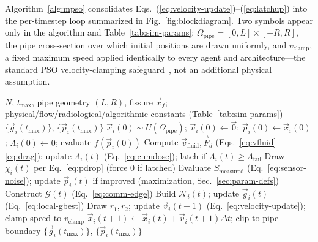 \documentclass[conference]{IEEEtran}
\begin{document}
Algorithm~\ref{alg:mpso} consolidates Eqs.~(\ref{eq:velocity-update})--(\ref{eq:latchup}) into the per-timestep loop summarized in Fig.~\ref{fig:blockdiagram}. Two symbols appear only in the algorithm and Table~\ref{tab:sim-params}: $\Omega_{\text{pipe}} = [0,L]\times[-R,R]$, the pipe cross-section over which initial positions are drawn uniformly, and $v_{\text{clamp}}$, a fixed maximum speed applied identically to every agent and architecture---the standard PSO velocity-clamping safeguard~\cite{shi_eberhart_1998}, not an additional physical assumption.

\begin{algorithm}[t]
\caption{Communication-Degradation-Tolerant Decentralized M-PSO}
\label{alg:mpso}
\small
\begin{algorithmic}[1]
\Require $N$, $t_{\max}$, pipe geometry $(L,R)$, fissure $\vec{x}_f$; physical/flow/radiological/algorithmic constants (Table~\ref{tab:sim-params})
\Ensure $\{\vec{g}_i(t_{\max})\}$, $\{\vec{p}_i(t_{\max})\}$
    \State $\vec{x}_i(0)\sim U(\Omega_{\text{pipe}})$; $\vec{v}_i(0)\leftarrow\vec{0}$; $\vec{p}_i(0)\leftarrow\vec{x}_i(0)$; $\Lambda_i(0)\leftarrow0$; evaluate $f(\vec{p}_i(0))$
\EndFor
{}
     
        \State Compute $\vec{v}_{\text{fluid}}, \vec{F}_d$ (Eqs.~\ref{eq:vfluid}--\ref{eq:drag}); update $\Lambda_i(t)$ (Eq.~\ref{eq:cumdose}); latch if $\Lambda_i(t)\ge\Lambda_{\text{fail}}$
        \State Draw $\chi_i(t)$ per Eq.~\ref{eq:pdrop} (force $0$ if latched)
        \State Evaluate $S_{\text{measured}}$ (Eq.~\ref{eq:sensor-noise}); update $\vec{p}_i(t)$ if improved (maximization, Sec.~\ref{sec:param-defs})
    \EndFor
    \State Construct $\mathcal{G}(t)$ (Eq.~\ref{eq:comm-edge}) 
        \State Build $\mathcal{N}_i(t)$; update $\vec{g}_i(t)$ (Eq.~\ref{eq:local-gbest})
    \EndFor
     
        \State Draw $r_1,r_2$; update $\vec{v}_i(t+1)$ (Eq.~\ref{eq:velocity-update}); clamp speed to $v_{\text{clamp}}$
        \State $\vec{x}_i(t+1)\leftarrow\vec{x}_i(t)+\vec{v}_i(t+1)\Delta t$; clip to pipe boundary
    \EndFor
\EndFor
\State \Return $\{\vec{g}_i(t_{\max})\}$, $\{\vec{p}_i(t_{\max})\}$
\end{algorithmic}
\end{algorithm}
\end{document}
